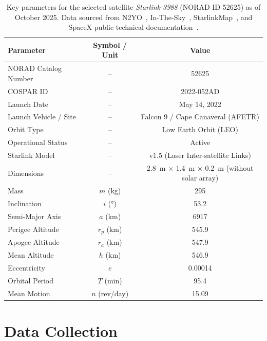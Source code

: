 \documentclass{article}
\begin{document}
\begin{table}[h]
    \centering
    \caption{Key parameters for the selected satellite \textit{Starlink-3988} (NORAD ID 52625) as of October 2025. Data sourced from N2YO~\cite{n2yo_starlink3988}, In-The-Sky~\cite{inthesky_starlink3988}, StarlinkMap~\cite{starlinkmap.org}, and SpaceX public technical documentation~\cite{spacex_starlink_specs}.}
    \label{tab:starlink3988_params}
    \begin{tabular}{|l|c|c|}
        \hline
        \textbf{Parameter} & \textbf{Symbol / Unit} & \textbf{Value} \\ \hline
        NORAD Catalog Number & -- & 52625 \\ \hline
        COSPAR ID & -- & 2022-052AD \\ \hline
        Launch Date & -- & May 14, 2022 \\ \hline
        Launch Vehicle / Site & -- & Falcon 9 / Cape Canaveral (AFETR) \\ \hline
        Orbit Type & -- & Low Earth Orbit (LEO) \\ \hline
        Operational Status & -- & Active \\ \hline
        Starlink Model & -- & v1.5 (Laser Inter-satellite Links) \\ \hline
        Dimensions & -- & \SI{2.8}{\metre} $\times$ \SI{1.4}{\metre} $\times$ \SI{0.2}{\metre} (without solar array) \\ \hline
        Mass & $m$ (\si{\kilo\gram}) & 295 \\ \hline
        Inclination & $i$ (\si{\degree}) & 53.2 \\ \hline
        Semi-Major Axis & $a$ (\si{\kilo\metre}) & 6917 \\ \hline
        Perigee Altitude & $r_p$ (\si{\kilo\metre}) & 545.9 \\ \hline
        Apogee Altitude & $r_a$ (\si{\kilo\metre}) & 547.9 \\ \hline
        Mean Altitude & $h$ (\si{\kilo\metre}) & 546.9 \\ \hline
        Eccentricity & $e$ & 0.00014 \\ \hline
        Orbital Period & $T$ (\si{\minute}) & 95.4 \\ \hline
        Mean Motion & $n$ (\si{rev/day}) & 15.09 \\ \hline
    \end{tabular}
\end{table}


\newpage
\section{Data Collection}
\end{document}
